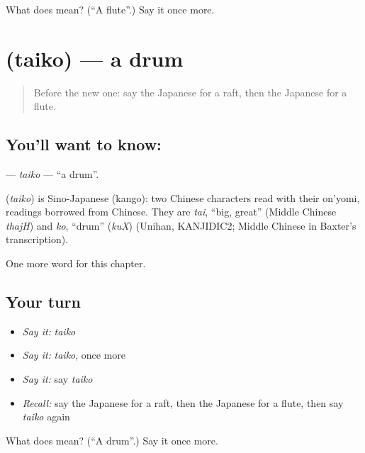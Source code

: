 \begin{tcolorbox}[breakable,colback=teal!4,colframe=teal!35!black,title={Before you move on}]
What does  mean? (\textquotedblleft{}A flute\textquotedblright{}.) Say it once more.
\end{tcolorbox}
\section[\texorpdfstring{\ja{たいこ} (taiko)}{たいこ (taiko)}]{ (taiko) — a drum}

\label{lesson:JA-C66-taiko}



\begin{quote}
Before the new one: say the Japanese for a raft, then the Japanese for a flute.
\end{quote}

\subsection*{You'll want to know: }
\textbf{} — \emph{taiko} — \textquotedblleft{}a drum\textquotedblright{}.

\begin{cousinweb}
\textbf{} (\emph{taiko}) is Sino-Japanese (kango): two Chinese characters read with their on'yomi, readings borrowed from Chinese. They are \emph{tai}, \textquotedblleft{}big, great\textquotedblright{} (Middle Chinese \emph{thajH}) and \emph{ko}, \textquotedblleft{}drum\textquotedblright{} (\emph{kuX}) (Unihan, KANJIDIC2; Middle Chinese in Baxter's transcription).
\end{cousinweb}

\begin{grammarlens}[title={What you've built}]
One more word for this chapter.
\end{grammarlens}

\subsection*{Your turn}
\begin{itemize}
\raggedright
  \item \emph{Say it:} \emph{taiko}
  \item \emph{Say it:} \emph{taiko}, once more
  \item \emph{Say it:} say \emph{taiko}
  \item \emph{Recall:} say the Japanese for a raft, then the Japanese for a flute, then say \emph{taiko} again
\end{itemize}

\begin{tcolorbox}[breakable,colback=teal!4,colframe=teal!35!black,title={Before you move on}]
What does  mean? (\textquotedblleft{}A drum\textquotedblright{}.) Say it once more.
\end{tcolorbox}
